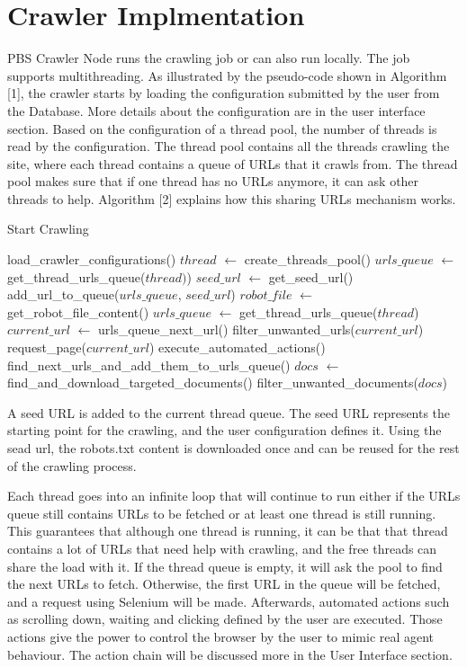 \section{Crawler Implmentation}

PBS Crawler Node runs the crawling job or can also run locally. The job supports multithreading. As illustrated by the pseudo-code shown in Algorithm [1], the crawler starts by loading the configuration submitted by the user from the Database. More details about the configuration are in the user interface section. Based on the configuration of a thread pool, the number of threads is read by the configuration. The thread pool contains all the threads crawling the site, where each thread contains a queue of URLs that it crawls from. The thread pool makes sure that if one thread has no URLs anymore, it can ask other threads to help. Algorithm [2] explains how this sharing URLs mechanism works. 


\begin{algorithm}[H]
	\caption{Start Crawling}\label{alg:alg1}
	\begin{algorithmic}[1]
		\State load\_crawler\_configurations()
		\State $thread$ $\gets$ create\_threads\_pool()
	    \State $urls\_queue$ $\gets$ get\_thread\_urls\_queue($thread)$)
	    \State $seed\_url$ $\gets$ get\_seed\_url()
	    \State add\_url\_to\_queue($urls\_queue$, $seed\_url$)
	    \State $robot\_file$ $\gets$ get\_robot\_file\_content()
		    \State $urls\_queue$ $\gets$ get\_thread\_urls\_queue($thread$)
		\Else
			\State $current\_url$ $\gets$ urls\_queue\_next\_url()
			\State filter\_unwanted\_urls($current\_url$)
			\State request\_page($current\_url$)
            \State execute\_automated\_actions()
			\State find\_next\_urls\_and\_add\_them\_to\_urls\_queue()
			\State $docs$ $\gets$ find\_and\_download\_targeted\_documents()
			\State filter\_unwanted\_documents($docs$)
		\EndIf
		\EndWhile

	\end{algorithmic}
\end{algorithm}


A seed URL is added to the current thread queue. The seed URL represents the starting point for the crawling, and the user configuration defines it. Using the sead url, the robots.txt content is downloaded once and can be reused for the rest of the crawling process.    

Each thread goes into an infinite loop that will continue to run either if the URLs queue still contains URLs to be fetched or at least one thread is still running. This guarantees that although one thread is running, it can be that that thread contains a lot of URLs that need help with crawling, and the free threads can share the load with it. If the thread queue is empty, it will ask the pool to find the next URLs to fetch. Otherwise, the first URL in the queue will be fetched, and a request using Selenium will be made. Afterwards, automated actions such as scrolling down, waiting and clicking defined by the user are executed. Those actions give the power to control the browser by the user to mimic real agent behaviour. The action chain will be discussed more in the User Interface section.  

